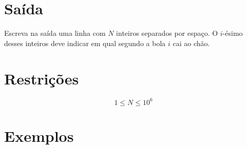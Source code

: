 \section*{Saída}

Escreva na saída uma linha com $N$ inteiros separados por espaço.
O $i$-ésimo desses inteiros deve indicar em qual segundo a bola $i$ cai ao chão.

\section*{Restrições}

$$1 \leq N \leq 10^{6}$$

\section*{Exemplos}
\exemplo

